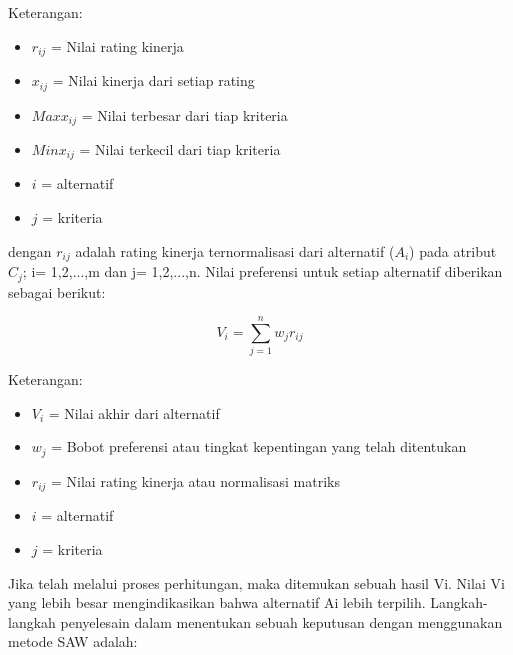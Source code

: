 \documentclass[a4paper,twoside]{article}
\begin{document}
\begin{enumerate}
	
	Keterangan:
	
	\begin{itemize}
		\item $r_{ij}$ = Nilai rating kinerja
		\item $x_{ij}$ = Nilai kinerja dari setiap rating
		\item $Max 	 x_{ij}$ = Nilai terbesar dari tiap kriteria
		\item $Min 	 x_{ij}$ = Nilai terkecil dari tiap kriteria
		\item $i$ = alternatif
		\item $j$ = kriteria
\end{itemize}
	
dengan $r_{ij}$ adalah rating kinerja ternormalisasi dari alternatif ($A_{i}$) pada atribut $C_{j}$; i= 1,2,...,m dan j= 1,2,...,n. Nilai preferensi untuk setiap alternatif diberikan sebagai berikut: 

\[
 V_{i} =\displaystyle\sum_{j=1}^{n} w_{j} r_{ij}
\]

Keterangan:
\begin{itemize}
	\item $V_{i}$ = Nilai akhir dari alternatif
	\item $w_{j}$ = Bobot preferensi atau tingkat kepentingan yang telah ditentukan
	\item $r_{ij}$ = Nilai rating kinerja atau normalisasi matriks
	\item $i$ = alternatif
		\item $j$ = kriteria
\end{itemize}
	
	Jika telah melalui proses perhitungan, maka ditemukan sebuah hasil Vi. Nilai Vi yang lebih besar mengindikasikan bahwa alternatif Ai lebih terpilih. Langkah-langkah penyelesain dalam menentukan sebuah keputusan dengan menggunakan metode SAW adalah:
	

\end{enumerate}
\end{document}
